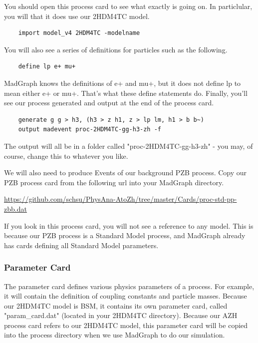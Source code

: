 \documentclass{article}
\begin{document}
\bigskip

You should open this process card to see what exactly is going on. In particlular, you will that it does use our 2HDM4TC model.

\begin{verbatim}
	import model_v4 2HDM4TC -modelname
\end{verbatim}

You will also see a series of definitions for particles such as the following.

\begin{verbatim}
	define lp e+ mu+
\end{verbatim}

MadGraph knows the definitions of e+ and mu+, but it does not define lp to mean either e+ or mu+.
That's what these define statements do. Finally, you'll see our process generated and output at
the end of the process card.

\begin{verbatim}
	generate g g > h3, (h3 > z h1, z > lp lm, h1 > b b~)
	output madevent proc-2HDM4TC-gg-h3-zh -f
\end{verbatim}

The output will all be in a folder called "proc-2HDM4TC-gg-h3-zh" - you may, of course, change this to whatever you like.

\bigskip

We will also need to produce Events of our background PZB process. Copy our PZB process card
from the following url into your MadGraph directory.

\bigskip

\url{https://github.com/schsu/PhysAna-AtoZh/tree/master/Cards/proc-std-pp-zbb.dat}

\bigskip

If you look in this process card, you will not see a reference to any model. This is because
our PZB process is a Standard Model process, and MadGraph already has cards defining all Standard Model parameters.

\subsubsection{Parameter Card}

The parameter card defines various physics parameters of a process. For example, it will contain the definition of coupling
constants and particle masses. Because our 2HDM4TC model is BSM, it contains its own parameter card, called "param\_card.dat" (located in your 2HDM4TC directory).
Because our AZH process card refers to our 2HDM4TC model, this parameter card will be copied into the process directory when
we use MadGraph to do our simulation.
\end{document}
